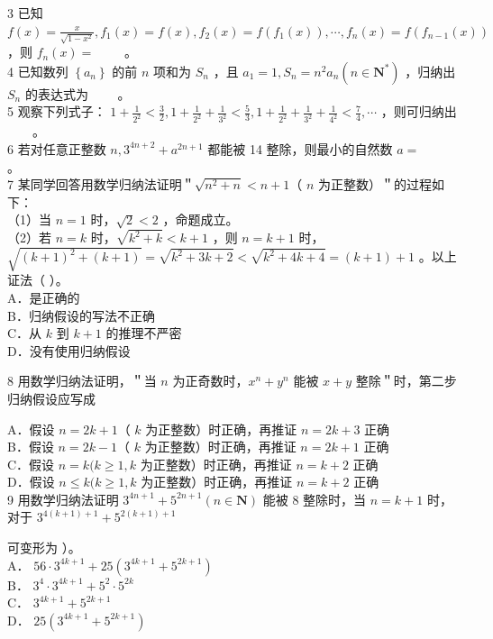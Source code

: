 \documentclass[10pt]{article}
\begin{document}
3 已知 \(f(x)=\frac{x}{\sqrt{1-x^{2}}}, f_{1}(x)=f(x), f_{2}(x)=f\left(f_{1}(x)\right), \cdots, f_{n}(x)=f\left(f_{n-1}(x)\right)\) ，则 \(f_{n}(x)=\) \(\qquad\)。\\
4 已知数列 \(\left\{a_{n}\right\}\) 的前 \(n\) 项和为 \(S_{n}\) ，且 \(a_{1}=1, S_{n}=n^{2} a_{n}\left(n \in \mathbf{N}^{*}\right)\) ，归纳出 \(S_{n}\) 的表达式为 \(\qquad\)。\\
5 观察下列式子： \(1+\frac{1}{2^{2}}<\frac{3}{2}, 1+\frac{1}{2^{2}}+\frac{1}{3^{2}}<\frac{5}{3}, 1+\frac{1}{2^{2}}+\frac{1}{3^{2}}+\frac{1}{4^{2}}<\frac{7}{4}, \cdots\) ，则可归纳出 \(\qquad\)。\\
6 若对任意正整数 \(n, 3^{4 n+2}+a^{2 n+1}\) 都能被 14 整除，则最小的自然数 \(a=\) \(\qquad\)。\\
7 某同学回答用数学归纳法证明＂\(\sqrt{n^{2}+n}<n+1\)（ \(n\) 为正整数）＂的过程如下：\\
（1）当 \(n=1\) 时，\(\sqrt{2}<2\) ，命题成立。\\
（2）若 \(n=k\) 时，\(\sqrt{k^{2}+k}<k+1\) ，则 \(n=k+1\) 时， \(\sqrt{(k+1)^{2}+(k+1)}=\sqrt{k^{2}+3 k+2}<\sqrt{k^{2}+4 k+4}=(k+1)+1\) 。以上证法（ ）。\\
A．是正确的\\
B．归纳假设的写法不正确\\
C．从 \(k\) 到 \(k+1\) 的推理不严密\\
D．没有使用归纳假设

8 用数学归纳法证明，＂当 \(n\) 为正奇数时，\(x^{n}+y^{n}\) 能被 \(x+y\) 整除＂时，第二步归纳假设应写成

A．假设 \(n=2 k+1\)（ \(k\) 为正整数）时正确，再推证 \(n=2 k+3\) 正确\\
B．假设 \(n=2 k-1\)（ \(k\) 为正整数）时正确，再推证 \(n=2 k+1\) 正确\\
C．假设 \(n=k(k \geqslant 1, k\) 为正整数）时正确，再推证 \(n=k+2\) 正确\\
D．假设 \(n \leqslant k(k \geqslant 1, k\) 为正整数）时正确，再推证 \(n=k+2\) 正确\\
9 用数学归纳法证明 \(3^{4 n+1}+5^{2 n+1}(n \in \mathbf{N})\) 能被 8 整除时，当 \(n=k+1\) 时，对于 \(3^{4(k+1)+1}+5^{2(k+1)+1}\)

可变形为 ）。\\
A． \(56 \cdot 3^{4 k+1}+25\left(3^{4 k+1}+5^{2 k+1}\right)\)\\
B． \(3^{4} \cdot 3^{4 k+1}+5^{2} \cdot 5^{2 k}\)\\
C． \(3^{4 k+1}+5^{2 k+1}\)\\
D． \(25\left(3^{4 k+1}+5^{2 k+1}\right)\)
\end{document}
